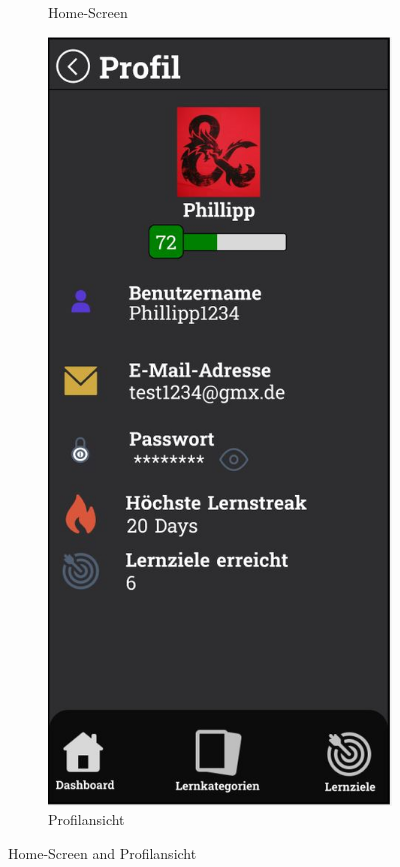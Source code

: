 \begin{figure}[htbp]
\begin{subfigure}[b]{0.45\linewidth}
    \caption{Home-Screen}
    \label{fig:home-screen}
  \end{subfigure}
  \hfill
  \begin{subfigure}[b]{0.45\linewidth}
    \centering
    \includegraphics[width=\linewidth]{images/Mockups/Profile.JPG}
    \caption{Profilansicht}
    \label{fig:profilansicht}
  \end{subfigure}
  \caption{Home-Screen and Profilansicht}
\end{figure}

